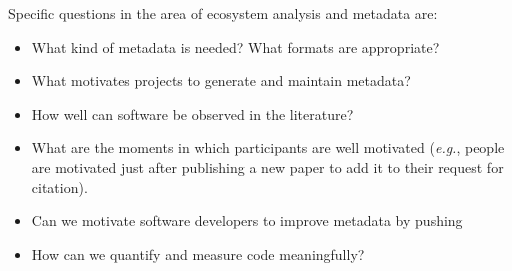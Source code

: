 \documentclass[a4paper,UKenglish]{dagman}
\newcommand{\eg}{\emph{e.g.},\xspace}
\begin{document}
Specific questions in the area of ecosystem analysis and metadata are:

\begin{itemize}
\item What kind of metadata is needed? What formats are appropriate?
\item What motivates projects to generate and maintain metadata?
\item How well can software be observed in the literature?
\item What are the moments in which participants are well motivated (\eg people are motivated just after publishing a new paper to add it to their request for citation).
\item Can we motivate software developers to improve metadata by pushing
\item How can we quantify and measure code meaningfully?
\end{itemize}
\end{document}
